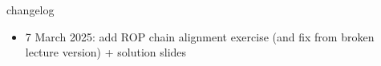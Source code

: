 \graphicspath{{./figures/}}
\title{}
\date{}

\begin{frame}
    \titlepage
\end{frame}


\usetikzlibrary{arrows.meta,positioning}

{\changelogmode
\begin{frame}{changelog}
    \begin{itemize}
    \item 7 March 2025: add ROP chain alignment exercise (and fix from broken lecture version) + solution slides
    \end{itemize}
\end{frame}
}



